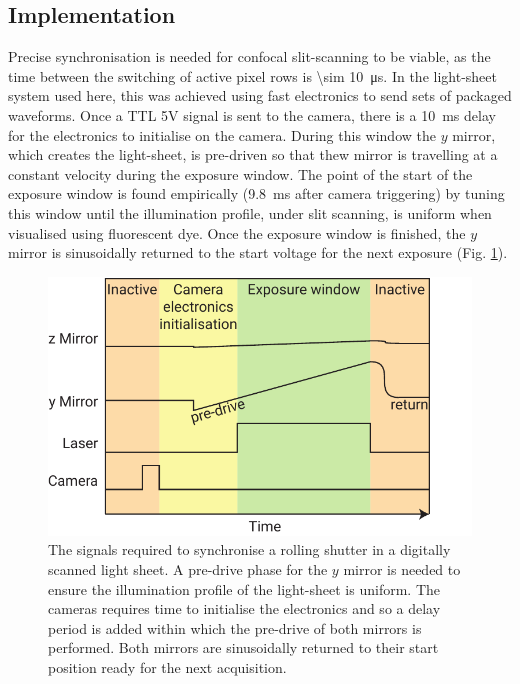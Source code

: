 \subsection{Implementation}

Precise synchronisation is needed for confocal slit-scanning to be viable, as the time between the switching of active pixel rows is \SI{\sim 10}{\micro\second}.
In the light-sheet system used here, this was achieved using fast electronics to send sets of packaged waveforms.
Once a TTL 5V signal is sent to the camera, there is a \SI{10}{\milli\second} delay for the electronics to initialise on the camera.
During this window the $y$ mirror, which creates the light-sheet, is pre-driven so that thew mirror is travelling at a constant velocity during the exposure window.
The point of the start of the exposure window is found empirically (\SI{9.8}{\milli\second} after camera triggering) by tuning this window until the illumination profile, under slit scanning, is uniform when visualised using fluorescent dye.
Once the exposure window is finished, the $y$ mirror is sinusoidally returned to the start voltage for the next exposure (Fig. \ref{fig:slit_signals}).

\begin{figure}
  \centering
  \includegraphics{slit_signals}
  \caption{The signals required to synchronise a rolling shutter in a digitally scanned light sheet.
  A pre-drive phase for the $y$ mirror is needed to ensure the illumination profile of the light-sheet is uniform.
  The cameras requires time to initialise the electronics and so a delay period is added within which the pre-drive of both mirrors is performed.
  Both mirrors are sinusoidally returned to their start position ready for the next acquisition.
  }
  \label{fig:slit_signals}
\end{figure}

